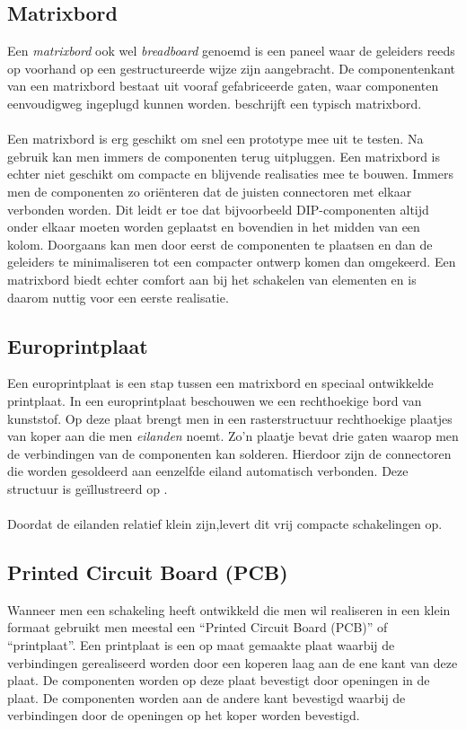 \subsection{Matrixbord}
Een \emph{matrixbord} ook wel \emph{breadboard} genoemd is een paneel waar de geleiders reeds op voorhand op een gestructureerde wijze zijn aangebracht. De componentenkant van een matrixbord bestaat uit vooraf gefabriceerde gaten, waar componenten eenvoudigweg ingeplugd kunnen worden.  beschrijft een typisch matrixbord.
\paragraph{}
Een matrixbord is erg geschikt om snel een prototype mee uit te testen. Na gebruik kan men immers de componenten terug uitpluggen. Een matrixbord is echter niet geschikt om compacte en blijvende realisaties mee te bouwen. Immers men de componenten zo ori\"enteren dat de juisten connectoren met elkaar verbonden worden. Dit leidt er toe dat bijvoorbeeld DIP-componenten altijd onder elkaar moeten worden geplaatst en bovendien in het midden van een kolom. Doorgaans kan men door eerst de componenten te plaatsen en dan de geleiders te minimaliseren tot een compacter ontwerp komen dan omgekeerd. Een matrixbord biedt echter comfort aan bij het schakelen van elementen en is daarom nuttig voor een eerste realisatie.
\subsection{Europrintplaat}
Een europrintplaat is een stap tussen een matrixbord en speciaal ontwikkelde printplaat. In een europrintplaat beschouwen we een rechthoekige bord van kunststof. Op deze plaat brengt men in een rasterstructuur rechthoekige plaatjes van koper aan die men \emph{eilanden} noemt. Zo'n plaatje bevat drie gaten waarop men de verbindingen van de componenten kan solderen. Hierdoor zijn de connectoren die worden gesoldeerd aan eenzelfde eiland automatisch verbonden. Deze structuur is ge\"illustreerd op .
\paragraph{}
Doordat de eilanden relatief klein zijn,levert dit vrij compacte schakelingen op.
\subsection{Printed Circuit Board (PCB)}
Wanneer men een schakeling heeft ontwikkeld die men wil realiseren in een klein formaat gebruikt men meestal een ``Printed Circuit Board (PCB)'' of ``printplaat''. Een printplaat is een op maat gemaakte plaat waarbij de verbindingen gerealiseerd worden door een koperen laag aan de ene kant van deze plaat. De componenten worden op deze plaat bevestigt door openingen in de plaat. De componenten worden aan de andere kant bevestigd waarbij de verbindingen door de openingen op het koper worden bevestigd.
